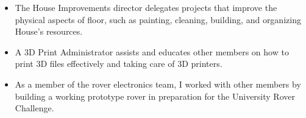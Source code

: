 


\cvtag{\LaTeX}
\divider

\divider

\divider





\begin{itemize}
    \item The House Improvements director delegates projects that improve the physical aspects of floor, such as painting, cleaning, building, and organizing House's resources.
\end{itemize}
\smallskip

\begin{itemize}
	\item A 3D Print Administrator assists and educates other members on how to print 3D files effectively and taking care of 3D printers.
\end{itemize}
\smallskip

\begin{itemize}
    \item As a member of the rover electronics team, I worked with other members by building a working prototype rover in preparation for the University Rover Challenge. 
\end{itemize}
